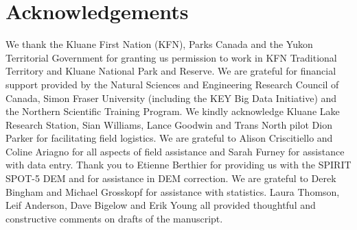 \documentclass[twocolumn,letterpaper]{igs}
\begin{document}


\section{Acknowledgements}

We thank the Kluane First Nation (KFN), Parks Canada and the Yukon Territorial Government for granting us permission to work in KFN Traditional Territory and Kluane National Park and Reserve. We are grateful for financial support provided by the Natural Sciences and Engineering Research Council of Canada, Simon Fraser University (including the KEY Big Data Initiative) and the Northern Scientific Training Program. We kindly acknowledge Kluane Lake Research Station, Sian Williams, Lance Goodwin and Trans North pilot Dion Parker for facilitating field logistics. We are grateful to Alison Criscitiello and Coline Ariagno for all aspects of field assistance and Sarah Furney for assistance with data entry. Thank you to Etienne Berthier for providing us with the SPIRIT SPOT-5 DEM and for assistance in DEM correction. We are grateful to Derek Bingham and Michael Grosskopf for assistance with statistics. Laura Thomson, Leif Anderson, Dave Bigelow and Erik Young all provided thoughtful and constructive comments on drafts of the manuscript.


%
%
%



\end{document}

